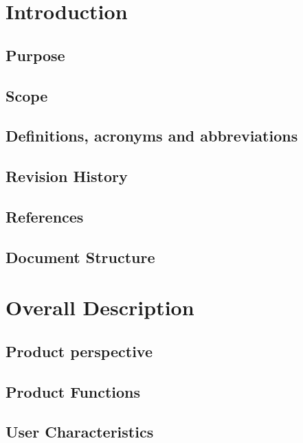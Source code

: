   
  \tableofcontents
   
  \chapter{Introduction}
  \section{Purpose}
  
  \section{Scope}
  
  \section{Definitions, acronyms and abbreviations}
  
  \section{Revision History}
  
  \section{References}
  
  \section{Document Structure}
  
  
  \chapter{Overall Description}
  \section{Product perspective}
  
  \section{Product Functions}
  
  \section{User Characteristics}
  
